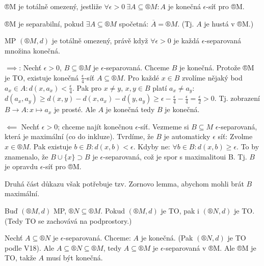 \documentclass[12pt]{article}					%
\begin{document}
    \begin{definice}
        ®M je totálně omezený, jestliže $\forall \epsilon > 0\ \exists A \subseteq ®M: A$ je konečná $\epsilon$-síť pro ®M.

        ®M je separabilní, pokud $\exists A \subseteq ®M$ spočetná: $\overline{A} = ®M$. (Tj. $A$ je hustá v ®M.)
    \end{definice}

    \begin{veta}
        MP $(®M, d)$ je totálně omezený, právě když $\forall \epsilon > 0$ je každá $\epsilon$-separovaná množina konečná.

        \begin{dukazin}
            $\implies$: Nechť $\epsilon > 0$, $B \subseteq ®M$ je $\epsilon$-separovaná. Chceme $B$ je konečná. Protože ®M je TO, existuje konečná $\frac{\epsilon}{4}$-síť $A \subseteq ®M$. Pro každé $x \in B$ zvolíme nějaký bod $a_x \in A: d(x, a_x) < \frac{\epsilon}{4}$. Pak pro $x≠y$, $x, y \in B$ platí $a_x ≠ a_y$: $d(a_x, a_y) ≥ d(x, y) - d(x, a_x) - d(y, a_y) ≥ \epsilon - \frac{\epsilon}{4} - \frac{\epsilon}{4} = \frac{\epsilon}{2} > 0$. Tj. zobrazení $B \rightarrow A: x \mapsto a_x$ je prosté. Ale $A$ je konečná tedy $B$ je konečná.

            $\impliedby$ Nechť $\epsilon > 0$; chceme najít konečnou $\epsilon$-síť. Vezmeme si $B \subseteq M$ $\epsilon$-separovaná, která je maximální (co do inkluze). Tvrdíme, že $B$ je automaticky $\epsilon$ síť: Zvolme $x \in ®M$. Pak existuje $b \in B: d(x, b) < \epsilon$. Kdyby ne: $\forall b \in B: d(x, b) ≥ \epsilon$. To by znamenalo, že $B \cup \{x\} \supset B$ je $\epsilon$-separovaná, což je spor s maximalitoui B. Tj. $B$ je opravdu $\epsilon$-síť pro ®M.

            Druhá část důkazu však potřebuje tzv. Zornovo lemma, abychom mohli brát $B$ maximální.
        \end{dukazin}
    \end{veta}


    \begin{veta}
        Buď $(®M, d)$ MP, $®N \subseteq ®M$. Pokud $(®M, d)$ je TO, pak i $(®N, d)$ je TO. (Tedy TO se zachovává na podprostory.)

        \begin{dukazin}
            Nechť $A \subseteq ®N$ je $\epsilon$-separovaná. Chceme: $A$ je konečná. (Pak $(®N, d)$ je TO podle V18). Ale $A \subseteq ®N \subseteq ®M$, tedy $A \subseteq ®M$ je $\epsilon$-separovaná v ®M. Ale ®M je TO, takže $A$ musí být konečná.
        \end{dukazin}
    \end{veta}
    
\end{document}
